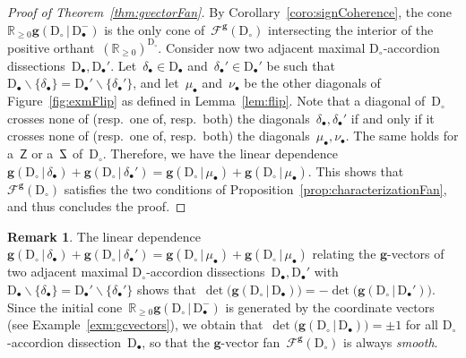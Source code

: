 \documentclass{amsart}
\theoremstyle{definition}
\newtheorem{remark}[theorem]{Remark}
\newcommand{\R}{\mathbb{R}} %
\renewcommand{\b}[1]{\mathbf{#1}} %
\newcommand{\ssm}{\smallsetminus} %
\newcommand{\fref}[1]{Figure~\ref{#1}} %
\newcommand{\darkblue}{\color{darkblue}} %
\newcommand{\defn}[1]{\textsl{\darkblue #1}} %
\newcommand{\dissection}{\mathrm{D}} %
\newcommand{\SSS}{\reflectbox{$\mathsf{Z}$}} %
\newcommand{\ZZZ}{\mathsf{Z}} %
\newcommand{\gvector}[2]{\mathbf{g}(#1 \,|\, #2)} %
\newcommand{\gvectors}[2]{\mathbf{g}(#1 \,|\, #2)} %
\newcommand{\gvectorFan}{\mathcal{F}^\mathbf{g}} %
\newcommand{\mi}{-} %
\begin{document}
\begin{proof}[Proof of Theorem~\ref{thm:gvectorFan}]
By Corollary~\ref{coro:signCoherence}, the cone $\R_{\ge0} \gvectors{\dissection_\circ}{\dissection_\bullet^\mi}$ is the only cone of~$\gvectorFan(\dissection_\circ)$ intersecting the interior of the positive orthant~$(\R_{\ge0})^{\dissection_\circ}$. %
Consider now two adjacent maximal $\dissection_\circ$-accordion dissections~$\dissection_\bullet, \dissection_\bullet'$. Let~$\delta_\bullet \in \dissection_\bullet$ and~${\delta_\bullet' \in \dissection_\bullet'}$ be such that~$\dissection_\bullet \ssm \{\delta_\bullet\} = \dissection_\bullet' \ssm \{\delta_\bullet'\}$, and let~$\mu_\bullet$ and~$\nu_\bullet$ be the other diagonals of \fref{fig:exmFlip} as defined in Lemma~\ref{lem:flip}. Note that a diagonal of~$\dissection_\circ$ crosses none of (resp.~one of, resp.~both) the diagonals~$\delta_\bullet, \delta_\bullet'$ if and only if it crosses none of (resp.~one of, resp.~both) the diagonals~$\mu_\bullet, \nu_\bullet$. The same holds for a~$\ZZZ$ or a~$\SSS$ of~$\dissection_\circ$. Therefore, we have the linear dependence~$\gvector{\dissection_\circ}{\delta_\bullet} + \gvector{\dissection_\circ}{\delta_\bullet'} = \gvector{\dissection_\circ}{\mu_\bullet} + \gvector{\dissection_\circ}{\mu_\bullet}$. This shows that~$\gvectorFan(\dissection_\circ)$ satisfies the two conditions of Proposition~\ref{prop:characterizationFan}, and thus concludes the proof.
\end{proof}

\begin{remark}
The linear dependence $\gvector{\dissection_\circ}{\delta_\bullet} + \gvector{\dissection_\circ}{\delta_\bullet'} = \gvector{\dissection_\circ}{\mu_\bullet} + \gvector{\dissection_\circ}{\mu_\bullet}$ relating the $\b{g}$-vectors of two adjacent maximal \mbox{$\dissection_\circ$-accordion} dissections~$\dissection_\bullet, \dissection_\bullet'$ with~${\dissection_\bullet \ssm \{\delta_\bullet\} = \dissection_\bullet' \ssm \{\delta_\bullet'\}}$ shows that~${\det \big( \gvector{\dissection_\circ}{\dissection_\bullet} \big) = - \det \big( \gvector{\dissection_\circ}{\dissection_\bullet'} \big)}$. Since the initial cone~$\R_{\ge0} \gvectors{\dissection_\circ}{\dissection_\bullet^\mi}$ is generated by the coordinate vectors (see Example~\ref{exm:gcvectors}), we obtain that~$\det \big( \gvector{\dissection_\circ}{\dissection_\bullet} \big) = \pm 1$ for all \mbox{$\dissection_\circ$-accordion} dissection~$\dissection_\bullet$, so that the $\b{g}$-vector fan~$\gvectorFan(\dissection_\circ)$ is always \defn{smooth}. 
\end{remark}
\end{document}
